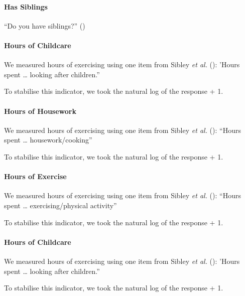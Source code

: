 \documentclass[
  single column]{article}
\let\oldparagraph\paragraph
\renewcommand{\paragraph}[1]{\oldparagraph{#1}\mbox{}}
\begin{document}
\paragraph{Has Siblings}\label{has-siblings}

``Do you have siblings?'' ()

\paragraph{Hours of Childcare}\label{hours-of-childcare}

We measured hours of exercising using one item from Sibley \emph{et al.}
(): 'Hours spent \ldots{} looking after
children.''

To stabilise this indicator, we took the natural log of the response +
1.

\paragraph{Hours of Housework}\label{hours-of-housework}

We measured hours of exercising using one item from Sibley \emph{et al.}
(): ``Hours spent \ldots{}
housework/cooking''

To stabilise this indicator, we took the natural log of the response +
1.

\paragraph{Hours of Exercise}\label{hours-of-exercise}

We measured hours of exercising using one item from Sibley \emph{et al.}
(): ``Hours spent \ldots{}
exercising/physical activity''

To stabilise this indicator, we took the natural log of the response +
1.

\paragraph{Hours of Childcare}\label{hours-of-childcare-1}

We measured hours of exercising using one item from Sibley \emph{et al.}
(): 'Hours spent \ldots{} looking after
children.''

To stabilise this indicator, we took the natural log of the response +
1.
\end{document}
